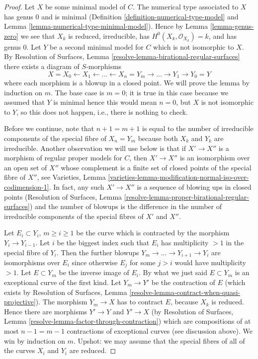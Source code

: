 \documentclass[10pt,a4paper]{amsart}
\theoremstyle{plain}
\theoremstyle{definition}
\theoremstyle{remark}
\numberwithin{equation}{subsection}
\begin{document}
\begin{proof}
Let $X$ be some minimal model of $C$. The numerical type associated to $X$
has genus $0$ and is minimal (Definition \ref{definition-numerical-type-model}
and Lemma \ref{lemma-numerical-type-minimal-model}).
Hence by Lemma \ref{lemma-genus-zero} we see that
$X_k$ is reduced, irreducible, has $H^0(X_k, \mathcal{O}_{X_k}) = k$,
and has genus $0$. Let $Y$ be a second minimal model for $C$
which is not isomorphic to $X$. By
Resolution of Surfaces, Lemma \ref{resolve-lemma-birational-regular-surfaces}
there exists a diagram of $S$-morphisms
$$
X = X_0 \leftarrow X_1 \leftarrow \ldots \leftarrow X_n = Y_m
\to \ldots \to Y_1 \to Y_0 = Y
$$
where each morphism is a blowup in a closed point. We will prove the
lemma by induction on $m$. The base case is $m = 0$; it is
true in this case because we assumed that $Y$ is minimal
hence this would mean $n = 0$, but $X$ is not isomorphic
to $Y$, so this does not happen, i.e., there is nothing to check.

\medskip\noindent
Before we continue, note that $n + 1 = m + 1$ is equal to the number of
irreducible components of the special fibre of $X_n = Y_m$ because
both $X_k$ and $Y_k$ are irreducible. Another observation we
will use below is that if $X' \to X''$ is a morphism
of regular proper models for $C$, then $X' \to X''$ is an isomorphism
over an open set of $X''$ whose complement is a finite set
of closed points of the special fibre of $X''$, see
Varieties, Lemma
\ref{varieties-lemma-modification-normal-iso-over-codimension-1}.
In fact, any such $X' \to X''$ is a sequence
of blowing ups in closed points (Resolution of Surfaces, Lemma
\ref{resolve-lemma-proper-birational-regular-surfaces}) and the
number of blowups is the difference in the number of irreducible
components of the special fibres of $X'$ and $X''$.

\medskip\noindent
Let $E_i \subset Y_i$, $m \geq i \geq 1$ be the curve which is contracted
by the morphism $Y_i \to Y_{i - 1}$. Let $i$ be the biggest index such
that $E_i$ has multiplicity $> 1$ in the special fibre of $Y_i$.
Then the further blowups $Y_m \to \ldots \to Y_{i + 1} \to Y_i$
are isomorphisms over $E_i$ since otherwise $E_j$ for some $j > i$
would have multiplicity $> 1$. Let $E \subset Y_m$ be the inverse
image of $E_i$. By what we just said $E \subset Y_m$ is an
exceptional curve of the first kind. Let $Y_m \to Y'$ be the
contraction of $E$ (which exists by Resolution of Surfaces, Lemma
\ref{resolve-lemma-contract-when-quasi-projective}). The morphism
$Y_m \to X$ has to contract $E$, because $X_k$ is reduced.
Hence there are morphisms $Y' \to Y$ and $Y' \to X$ (by
Resolution of Surfaces, Lemma
\ref{resolve-lemma-factor-through-contraction})
which are compositions of at most $n - 1 = m - 1$ contractions
of exceptional curves (see discussion above). We win by induction on $m$.
Upshot: we may assume that the special fibres of all of
the curves $X_i$ and $Y_i$ are reduced.


\end{proof}
\end{document}
